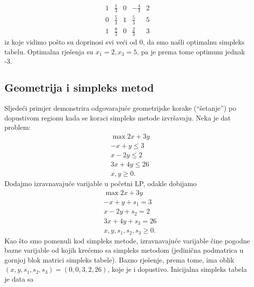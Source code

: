 \documentclass[a4paper, utf8, 11pt, colorlinks]{article}
\begin{document}
$$ \begin{array}{cccc|c}
       1   & \frac{1}{3}       & 0             &   -\frac{4}{3}             &   2  \\
       0   & \frac{5}{3}       & 1	           & \frac{5}{3}                 &   5 \\ \hline
       1   & \frac{8}{3}       & 0             &  \frac{2}{3}               &   3  
   \end{array}
 $$
 iz koje vidimo pošto su doprinosi svi veći od 0, da smo našli optimalnu simpleks tabelu.  Optimalna rješenja su 
 $x_1=2, x_3=5$, pa je prema tome optimum jednak -3.
 
 \subsection{Geometrija i simpleks metod}
 
Sljedeći primjer demonstrira odgovarajuće geometrijske korake (``šetanje'') po dopustivom regionu kada se koraci simpleks metode izvršavaju.   %
 Neka je dat problem:
 \begin{align*}
 	&\max 2x + 3y \\
 	& -x + y \leq 3 \\
 	& x - 2y \leq 2 \\
 	& 3x + 4y \leq 26 \\
 	& x, y \geq 0.
 \end{align*}
 Dodajmo izravnavajuće varijable u početni LP, odakle dobijamo 
  \begin{align*}
 	&\max 2x + 3y \\
 	& -x + y + s_1 = 3 \\
 	& x - 2y + s_2 = 2 \\
 	& 3x + 4y + s_3 =  26 \\
 	& x, y, s_1, s_2, s_3 \geq 0.
 \end{align*}
Kao što smo pomenuli kod simpleks metode, 
izravnavajuće varijable čine pogodne bazne varijable od kojih krećemo 
sa simpleks metodom (jedinična podmatrica u gornjoj blok matrici 
simpleks tabele). Bazno rješenje, prema tome, ima oblik 
$(x, y, s_1, s_2, s_3) = (0, 0, 3, 2, 26)$, koje je i dopustivo. Inicijalna simpleks 
tabela je data sa
\end{document}
